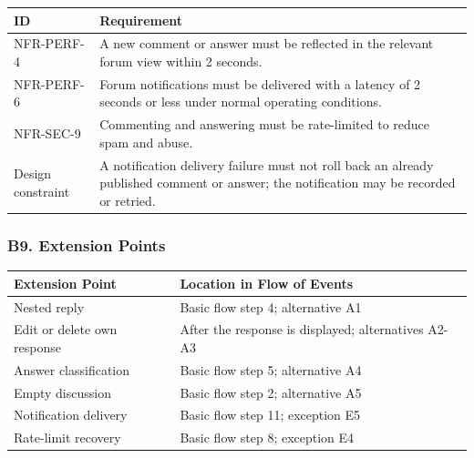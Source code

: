 \documentclass[12pt]{article}
\renewcommand{\baselinestretch}{1.5}
\begin{document}
\begingroup
\small
\renewcommand{\baselinestretch}{1.0}\selectfont
\renewcommand{\arraystretch}{1.15}
\setlength{\tabcolsep}{6pt}
\begin{longtable}{|>{\raggedright\arraybackslash}p{}|>{\raggedright\arraybackslash}p{}|}
\hline
\textbf{ID} & \textbf{Requirement} \\ \hline
\endhead
NFR-PERF-4 & A new comment or answer must be reflected in the relevant forum view within 2 seconds. \\ \hline
NFR-PERF-6 & Forum notifications must be delivered with a latency of 2 seconds or less under normal operating conditions. \\ \hline
NFR-SEC-9 & Commenting and answering must be rate-limited to reduce spam and abuse. \\ \hline
Design constraint & A notification delivery failure must not roll back an already published comment or answer; the notification may be recorded or retried. \\ \hline
\end{longtable}
\endgroup
\par\medskip

\hypertarget{sec:b9-extension-points}{}
\subsubsection*{B9. Extension Points}
\par\medskip

\begingroup
\small
\renewcommand{\baselinestretch}{1.0}\selectfont
\renewcommand{\arraystretch}{1.15}
\setlength{\tabcolsep}{6pt}
\begin{longtable}{|>{\raggedright\arraybackslash}p{}|>{\raggedright\arraybackslash}p{}|}
\hline
\textbf{Extension Point} & \textbf{Location in Flow of Events} \\ \hline
\endhead
Nested reply & Basic flow step 4; alternative A1 \\ \hline
Edit or delete own response & After the response is displayed; alternatives A2-A3 \\ \hline
Answer classification & Basic flow step 5; alternative A4 \\ \hline
Empty discussion & Basic flow step 2; alternative A5 \\ \hline
Notification delivery & Basic flow step 11; exception E5 \\ \hline
Rate-limit recovery & Basic flow step 8; exception E4 \\ \hline
\end{longtable}
\endgroup
\par\medskip
\end{document}
